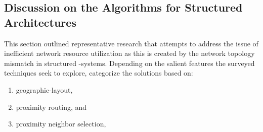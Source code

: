 \subsection{Discussion on the Algorithms for Structured Architectures}


This section outlined
representative research that attempts 
to address the issue of inefficient network resource utilization 
as this is created by the network topology mismatch
in structured \p-systems.
Depending on the salient features the surveyed techniques seek to explore,
\cite{CDHR2002,CDCR2002,RSS2002} categorize the solutions based on:
%
\begin{enumerate}
  \item geographic-layout,
  \item proximity routing, and 
  \item proximity neighbor selection,
\end{enumerate}

